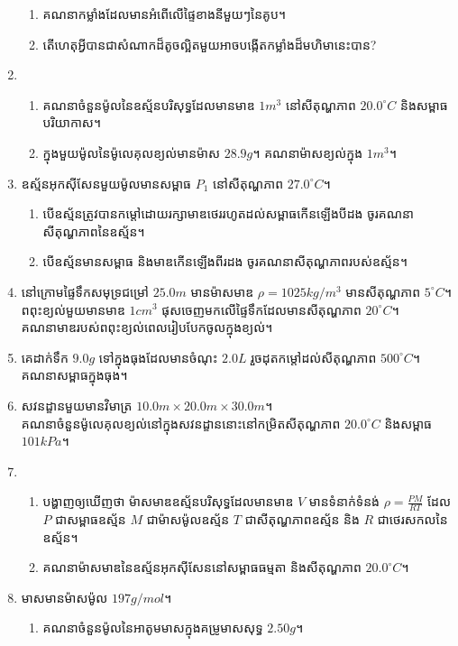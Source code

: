 \begin{enumerate}[m]
\begin{enumerate}[k]
	\item គណនាកម្លាំងដែលមានអំពើលើផ្ទៃខាងនីមួយៗនៃគូប។
	\item តើហេតុអ្វីបានជាសំណាកដ៏តូចល្អិតមួយអាចបង្កើតកម្លាំងដ៏មហិមានេះបាន?
\end{enumerate}
\item \begin{enumerate}[k]
	\item គណនាចំនួនម៉ូលនៃឧស្ម័នបរិសុទ្ធដែលមានមាឌ $1m^{3}$ នៅសីតុណ្ហភាព $20.0^\circ C$ និងសម្ពាធបរិយាកាស។
	\item ក្នុងមួយម៉ូលនៃម៉ូលេគុលខ្យល់មានម៉ាស $28.9g$។ គណនាម៉ាសខ្យល់ក្នុង $1m^{3}$។
\end{enumerate}
\item ឧស្ម័នអុកសុីសែនមួយម៉ូលមានសម្ពាធ $P_{1}$ នៅសីតុណ្ហភាព $27.0^\circ C$។
\begin{enumerate}[k]
	\item បើឧស្ម័នត្រូវបានកម្តៅដោយរក្សាមាឌថេររហូតដល់សម្ពាធកើនឡើងបីដង ចូរគណនាសីតុណ្ហភាពនៃឧស្ម័ន។
	\item បើឧស្ម័នមានសម្ពាធ និងមាឌកើនឡើងពីរដង ចូរគណនាសីតុណ្ហភាពរបស់ឧស្ម័ន។
\end{enumerate}
\item នៅក្រោមផ្ទៃទឹកសមុទ្រជម្រៅ $25.0m$ មានម៉ាសមាឌ $\rho=1025kg/m^{3}$ មានសីតុណ្ហភាព $5^\circ C$។ ពពុះខ្យល់មួយមានមាឌ $1cm^{3}$ ផុសចេញមកលើផ្ទៃទឹកដែលមានសីតុណ្ហភាព $20^\circ C$។\\ គណនាមាឌរបស់ពពុះខ្យល់ពេលរៀបបែកចូលក្នុងខ្យល់។
\item គេដាក់ទឹក $9.0g$ ទៅក្នុងធុងដែលមានចំណុះ $2.0L$ រួចដុតកម្តៅដល់សីតុណ្ហភាព $500^\circ C$។ \\គណនាសម្ពាធក្នុងធុង។
\item សវនដ្ខានមួយមានវិមាត្រ $10.0m\times20.0m\times30.0m$។\\ គណនាចំនួនម៉ូលេគុលខ្យល់នៅក្នុងសវនដ្ខាននោះនៅកម្រិតសីតុណ្ហភាព $20.0^\circ C$ និងសម្ពាធ $101kPa$។
\item \begin{enumerate}[k]
	\item បង្ហាញឲ្យឃើញថា ម៉ាសមាឌឧស្ម័នបរិសុទ្ធដែលមានមាឌ $V$ មានទំនាក់ទំនង់ $\rho =\frac{PM}{RT}$ ដែល $P$ ជាសម្ពាធឧស្ម័ន $M$ ជាម៉ាសម៉ូលឧស្ម័ន $T$ ជាសីតុណ្ហភាពឧស្ម័ន និង $R$ ជាថេរសកលនៃឧស្ម័ន។
	\item គណនាម៉ាសមាឌនៃឧស្ម័នអុកសុីសែននៅសម្ពាធធម្មតា និងសីតុណ្ហភាព $20.0^\circ C$។
\end{enumerate}
\item មាសមានម៉ាសម៉ូល $197g/mol$។
\begin{enumerate}[k]
	\item គណនាចំនួនម៉ូលនៃអាតូមមាសក្នុងគម្រូមាសសុទ្ធ $2.50g$។

\end{enumerate}
\end{enumerate}
